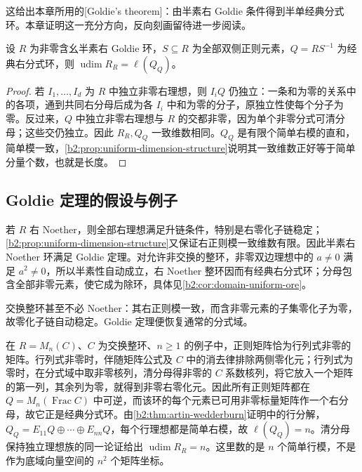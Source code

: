 这给出本章所用的[Goldie's theorem]：由半素右 Goldie 条件得到半单经典分式环。本章证明这一充分方向，反向刻画留待进一步阅读。

\begin{corollary}\label{b2:cor:goldie-rank}
	设 \(R\) 为非零含幺半素右 Goldie 环，\(S\subseteq R\) 为全部双侧正则元素，\(Q=RS^{-1}\) 为经典右分式环，则 \(\operatorname{udim}R_R=\ell(Q_Q)\)。
\end{corollary}
\begin{proof}
	若 \(I_1,\ldots,I_d\) 为 \(R\) 中独立非零右理想，则 \(I_iQ\) 仍独立：一条和为零的关系中的各项，通到共同右分母后成为各 \(I_i\) 中和为零的分子，原独立性使每个分子为零。反过来，\(Q\) 中独立非零右理想与 \(R\) 的交都非零，因为单个非零分式可清分母；这些交仍独立。因此 \(R_R,Q_Q\) 一致维数相同。\(Q_Q\) 是有限个简单右模的直和，简单模一致，\cref{b2:prop:uniform-dimension-structure}说明其一致维数正好等于简单分量个数，也就是长度。
\end{proof}

\subsection{Goldie 定理的假设与例子}
\label{b2:subsec:1902:03}

若 \(R\) 右 Noether，则全部右理想满足升链条件，特别是右零化子链稳定；\cref{b2:prop:uniform-dimension-structure}又保证右正则模一致维数有限。因此半素右 Noether 环满足 Goldie 定理。对允许非交换的整环，非零双边理想中的 \(a\ne0\) 满足 \(a^2\ne0\)，所以半素性自动成立，右 Noether 整环因而有经典右分式环；分母包含全部非零元素，使它成为除环，具体见\cref{b2:cor:domain-uniform-ore}。

\ProseParagraphBreak
交换整环甚至不必 Noether：其右正则模一致，而含非零元素的子集零化子为零，故零化子链自动稳定。Goldie 定理便恢复通常的分式域。

\ProseParagraphBreak
在 \(R=M_n(C)\)、\(C\) 为交换整环、\(n\ge1\) 的例子中，正则矩阵恰为行列式非零的矩阵。行列式非零时，伴随矩阵公式及 \(C\) 中的消去律排除两侧零化元；行列式为零时，在分式域中取非零核列，清分母得非零的 \(C\) 系数核列，将它放入一个矩阵的第一列，其余列为零，就得到非零右零化元。因此所有正则矩阵都在 \(Q=M_n(\operatorname{Frac}C)\) 中可逆，而该环的每个元素已可用非零标量矩阵作一个右分母，故它正是经典分式环。由\cref{b2:thm:artin-wedderburn}证明中的行分解，\(Q_Q=E_{11}Q\oplus\cdots\oplus E_{nn}Q\)，每个行理想都是简单右模，故 \(\ell(Q_Q)=n\)。清分母保持独立理想族的同一论证给出 \(\operatorname{udim}R_R=n\)。这里数的是 \(n\) 个简单行模，不是作为底域向量空间的 \(n^2\) 个矩阵坐标。

